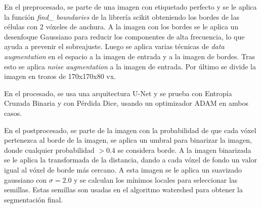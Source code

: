 
En el preprocesado, se parte de una imagen con etiquetado perfecto y se le aplica la función \textit{find\_ boundaries} de la librería scikit \cite{Pedregosa2011} \cite{Walt2014} obteniendo los bordes de las células con 2 vóxeles de anchura. A la imagen con los bordes se le aplica un desenfoque Gaussiano para reducir los componentes de alta frecuencia, lo que ayuda a prevenir el sobreajuste. Luego se aplica varias técnicas de \textit{data augmentation} en el espacio a la imagen de entrada y a la imagen de bordes. Tras esto se aplica \textit{noise augmentation} a la imagen de entrada. Por último se divide la imagen en trozos de 170x170x80 vx.

En el procesado, se usa una arquitectura U-Net y se prueba con Entropía Cruzada Binaria y con Pérdida Dice, usando un optimizador ADAM en ambos casos.

En el postprocesado, se parte de la imagen con la probabilidad de que cada vóxel pertenezca al borde de la imagen, se aplica un umbral para binarizar la imagen, donde cualquier probabilidad $>0.4$ se considera borde. A la imagen binarizada se le aplica la transformada de la distancia, dando a cada vóxel de fondo un valor igual al vóxel de borde más cercano. A esta imagen se le aplica un suavizado gaussiano con $\sigma = 2.0$ y se calculan los mínimos locales para seleccionar las semillas. Estas semillas son usadas en el algoritmo watershed para obtener la segmentación final.

